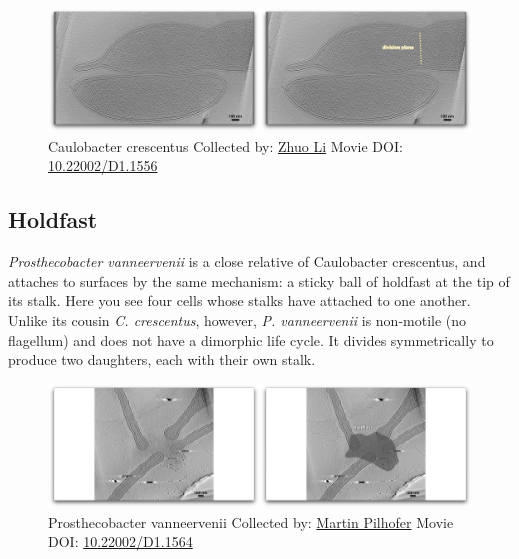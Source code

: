 \documentclass[]{tufte-book}
\begin{document}
\begin{figure}
\includegraphics{movie_stills/8_4} \caption[Caulobacter crescentus Collected by:
\protect\hyperlink{zhuo_li}{Zhuo Li} Movie DOI:
\href{https://doi.org/10.22002/D1.1556}{10.22002/D1.1556}]{Caulobacter crescentus Collected by:
\protect\hyperlink{zhuo_li}{Zhuo Li} Movie DOI:
\href{https://doi.org/10.22002/D1.1556}{10.22002/D1.1556}}\label{fig:8-4}
\end{figure}

\hypertarget{Holdfast}{\subsection{Holdfast}\label{Holdfast}}

\emph{Prosthecobacter vanneervenii} is a close relative of Caulobacter
crescentus, and attaches to surfaces by the same mechanism: a sticky
ball of holdfast at the tip of its stalk. Here you see four cells whose
stalks have attached to one another. Unlike its cousin \emph{C.
crescentus}, however, \emph{P. vanneervenii} is non-motile (no
flagellum) and does not have a dimorphic life cycle. It divides
symmetrically to produce two daughters, each with their own stalk.





\begin{figure}
\includegraphics{movie_stills/8_4a} \caption[Prosthecobacter vanneervenii Collected by:
\protect\hyperlink{martin_pilhofer}{Martin Pilhofer} Movie DOI:
\href{https://doi.org/10.22002/D1.1564}{10.22002/D1.1564}]{Prosthecobacter vanneervenii Collected by:
\protect\hyperlink{martin_pilhofer}{Martin Pilhofer} Movie DOI:
\href{https://doi.org/10.22002/D1.1564}{10.22002/D1.1564}}\label{fig:8-4a}
\end{figure}
\end{document}
